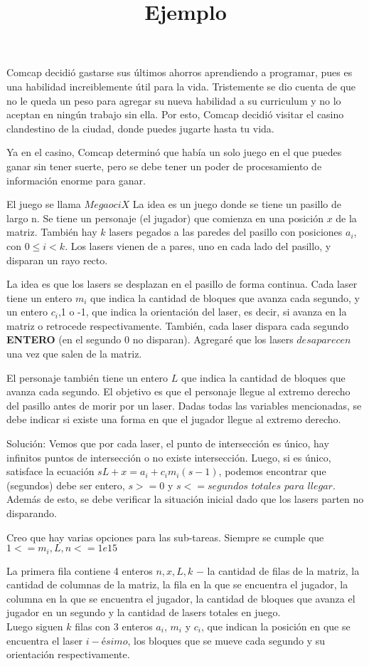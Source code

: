 \documentclass{oci}
\title{Ejemplo}
\begin{document}
\begin{problemDescription}
Comcap decidió gastarse sus últimos ahorros aprendiendo a programar, pues es una habilidad increiblemente útil para la vida. Tristemente se dio cuenta de que no le queda un peso para agregar su nueva habilidad a su curriculum y no lo aceptan en ningún trabajo sin ella. Por esto, Comcap decidió visitar el casino clandestino de la ciudad, donde puedes jugarte hasta tu vida.

Ya en el casino, Comcap determinó que había un solo juego en el que puedes ganar sin tener suerte, pero se debe tener un poder de procesamiento de información enorme para ganar. 

El juego se llama $Mega oci X$
La idea es un juego donde se tiene un pasillo de largo n. Se tiene un personaje (el jugador) que comienza en una posición $x$ de la matriz. También hay $k$ lasers pegados a las paredes del pasillo con posiciones $a_i$, con $0\leq i<k$. Los lasers vienen de a pares, uno en cada lado del pasillo, y disparan un rayo recto.

La idea es que los lasers se desplazan en el pasillo de forma continua. Cada laser tiene un entero $m_i$ que indica la cantidad de bloques que avanza cada segundo, y un entero $c_i$,1 o -1, que indica la orientación del laser, es decir, si avanza en la matriz o retrocede respectivamente. También, cada laser dispara cada segundo \textbf{ENTERO} (en el segundo 0 no disparan). Agregaré que los lasers $desaparecen$ una vez que salen de la matriz.

El personaje también tiene un entero $L$ que indica la cantidad de bloques que avanza cada segundo. El objetivo es que el personaje llegue al extremo derecho del pasillo antes de morir por un laser. Dadas todas las variables mencionadas, se debe indicar si existe una forma en que el jugador llegue al extremo derecho.

Solución: Vemos que por cada laser, el punto de intersección es único, hay infinitos puntos de intersección o no existe intersección. Luego, si es único, satisface la ecuación $sL+x=a_i+c_im_i(s-1)$, podemos encontrar que (segundos) debe ser entero, $s>=0$ y $s<=segundos$ $totales$ $para$ $llegar$. Además de esto, se debe verificar la situación inicial dado que los lasers parten no disparando. 

Creo que hay varias opciones para las sub-tareas. Siempre se cumple que $1<=m_i, L, n<=1e15$
\end{problemDescription}

\begin{inputDescription}
La primera fila contiene 4 enteros $n, x, L, k$ $-$ la cantidad de filas de la matriz, la cantidad de columnas de la matriz, la fila en la que se encuentra el jugador, la columna en la que se encuentra el jugador, la cantidad de bloques que avanza el jugador en un segundo y la cantidad de lasers totales en juego.\\
Luego siguen $k$ filas con 3 enteros $a_i$, $m_i$ y $c_i$, que indican la posición en que se encuentra el laser $i-ésimo$, los bloques que se mueve cada segundo y su orientación respectivamente.
\end{inputDescription}
\end{document}
